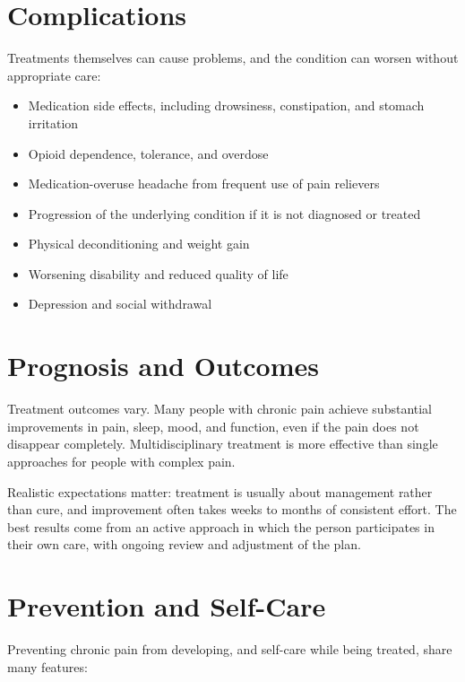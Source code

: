 \section*{Complications}
Treatments themselves can cause problems, and the condition can worsen without appropriate care:

\begin{itemize}
    \item Medication side effects, including drowsiness, constipation, and stomach irritation
    \item Opioid dependence, tolerance, and overdose
    \item Medication-overuse headache from frequent use of pain relievers
    \item Progression of the underlying condition if it is not diagnosed or treated
    \item Physical deconditioning and weight gain
    \item Worsening disability and reduced quality of life
    \item Depression and social withdrawal
\end{itemize}

\section*{Prognosis and Outcomes}
Treatment outcomes vary. Many people with chronic pain achieve substantial improvements in pain, sleep, mood, and function, even if the pain does not disappear completely. Multidisciplinary treatment is more effective than single approaches for people with complex pain.

Realistic expectations matter: treatment is usually about management rather than cure, and improvement often takes weeks to months of consistent effort. The best results come from an active approach in which the person participates in their own care, with ongoing review and adjustment of the plan.

\section*{Prevention and Self-Care}
Preventing chronic pain from developing, and self-care while being treated, share many features:

